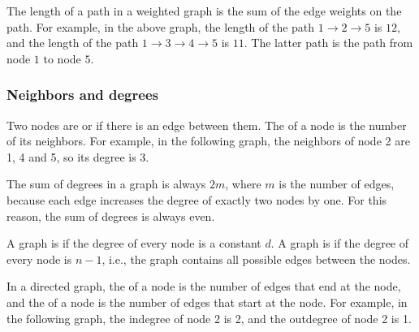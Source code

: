 The length of a path in a weighted graph
is the sum of the edge weights on the path.
For example, in the above graph,
the length of the path
$1 \rightarrow 2 \rightarrow 5$ is $12$,
and the length of the path
$1 \rightarrow 3 \rightarrow 4 \rightarrow 5$ is $11$.
The latter path is the  path from node $1$ to node $5$.

\subsubsection{Neighbors and degrees}


Two nodes are  or 
if there is an edge between them.
The  of a node
is the number of its neighbors.
For example, in the following graph,
the neighbors of node 2 are 1, 4 and 5,
so its degree is 3.

\begin{center}
\end{center}

The sum of degrees in a graph is always $2m$,
where $m$ is the number of edges,
because each edge
increases the degree of exactly two nodes by one.
For this reason, the sum of degrees is always even.


A graph is  if the
degree of every node is a constant $d$.
A graph is  if the
degree of every node is $n-1$, i.e.,
the graph contains all possible edges
between the nodes.


In a directed graph, the 
of a node is the number of edges
that end at the node,
and the  of a node
is the number of edges that start at the node.
For example, in the following graph,
the indegree of node 2 is 2,
and the outdegree of node 2 is 1.

